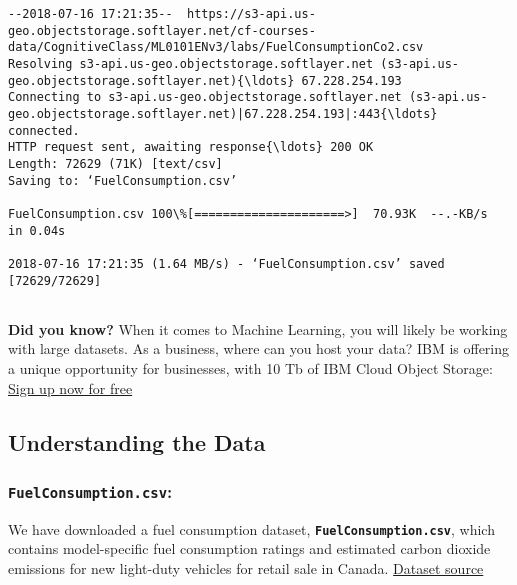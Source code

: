 \documentclass[11pt]{article}
\begin{document}
    \begin{Verbatim}[commandchars=\\\{\}]
--2018-07-16 17:21:35--  https://s3-api.us-geo.objectstorage.softlayer.net/cf-courses-data/CognitiveClass/ML0101ENv3/labs/FuelConsumptionCo2.csv
Resolving s3-api.us-geo.objectstorage.softlayer.net (s3-api.us-geo.objectstorage.softlayer.net){\ldots} 67.228.254.193
Connecting to s3-api.us-geo.objectstorage.softlayer.net (s3-api.us-geo.objectstorage.softlayer.net)|67.228.254.193|:443{\ldots} connected.
HTTP request sent, awaiting response{\ldots} 200 OK
Length: 72629 (71K) [text/csv]
Saving to: ‘FuelConsumption.csv’

FuelConsumption.csv 100\%[=====================>]  70.93K  --.-KB/s   in 0.04s  

2018-07-16 17:21:35 (1.64 MB/s) - ‘FuelConsumption.csv’ saved [72629/72629]


    \end{Verbatim}

    \textbf{Did you know?} When it comes to Machine Learning, you will
likely be working with large datasets. As a business, where can you host
your data? IBM is offering a unique opportunity for businesses, with 10
Tb of IBM Cloud Object Storage:
\href{http://cocl.us/ML0101EN-IBM-Offer-CC}{Sign up now for free}

    \subsection{Understanding the Data}\label{understanding-the-data}

\subsubsection{\texorpdfstring{\texttt{FuelConsumption.csv}:}{FuelConsumption.csv:}}\label{fuelconsumption.csv}

We have downloaded a fuel consumption dataset,
\textbf{\texttt{FuelConsumption.csv}}, which contains model-specific
fuel consumption ratings and estimated carbon dioxide emissions for new
light-duty vehicles for retail sale in Canada.
\href{http://open.canada.ca/data/en/dataset/98f1a129-f628-4ce4-b24d-6f16bf24dd64}{Dataset
source}
\end{document}
